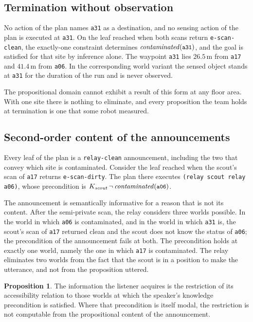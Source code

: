 \documentclass[11pt,a4paper]{article}
\theoremstyle{definition}
\newtheorem{proposition}{Proposition}
\newcommand{\Kop}[1]{K_{#1}}
\newcommand{\code}[1]{\texttt{\small #1}}
\newcommand{\site}[1]{\code{#1}}
\begin{document}
\subsection{Termination without observation}
\label{sec:elimination}

No action of the plan names \site{a31} as a destination, and no sensing action
of the plan is executed at \site{a31}. On the leaf reached when both scans
return \code{e-scan-clean}, the exactly-one constraint determines
$\mathit{contaminated}(\site{a31})$, and the goal is satisfied for that site by
inference alone. The waypoint \site{a31} lies $26.5$\,m from \site{a17} and
$41.4$\,m from \site{a06}. In the corresponding world variant the sensed object
stands at \site{a31} for the duration of the run and is never observed.

The propositional domain cannot exhibit a result of this form at any floor
area. With one site there is nothing to eliminate, and every proposition the
team holds at termination is one that some robot measured.

\subsection{Second-order content of the announcements}
\label{sec:secondorder}

Every leaf of the plan is a \code{relay-clean} announcement, including the two
that convey which site is contaminated. Consider the leaf reached when the
scout's scan of \site{a17} returns \code{e-scan-dirty}. The plan there executes
\code{(relay scout relay a06)}, whose precondition is
$\Kop{\mathit{scout}}\,\neg\,\mathit{contaminated}(\site{a06})$.

The announcement is semantically informative for a reason that is not its
content. After the semi-private scan, the relay considers three worlds
possible. In the world in which \site{a06} is contaminated, and in the world in
which \site{a31} is, the scout's scan of \site{a17} returned clean and the
scout does not know the status of \site{a06}; the precondition of the
announcement fails at both. The precondition holds at exactly one world, namely
the one in which \site{a17} is contaminated. The relay eliminates two worlds
from the fact that the scout is in a position to make the utterance, and not
from the proposition uttered.

\begin{proposition}
The information the listener acquires is the restriction of its accessibility
relation to those worlds at which the speaker's knowledge precondition is
satisfied. Where that precondition is itself modal, the restriction is not
computable from the propositional content of the announcement.
\end{proposition}
\end{document}
